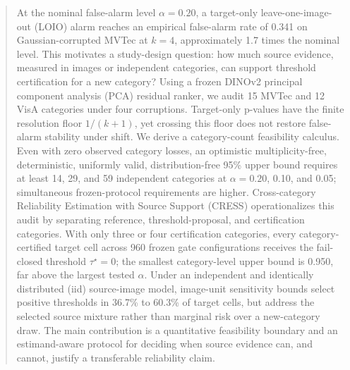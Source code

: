 \begin{abstract}
At the nominal false-alarm level $\alpha=0.20$, a target-only leave-one-image-out (LOIO) alarm reaches an empirical false-alarm rate of 0.341 on Gaussian-corrupted MVTec at $k=4$, approximately 1.7 times the nominal level. This motivates a study-design question: how much source evidence, measured in images or independent categories, can support threshold certification for a new category? Using a frozen DINOv2 principal component analysis (PCA) residual ranker, we audit 15 MVTec and 12 VisA categories under four corruptions. Target-only p-values have the finite resolution floor $1/(k{+}1)$, yet crossing this floor does not restore false-alarm stability under shift. We derive a category-count feasibility calculus. Even with zero observed category losses, an optimistic multiplicity-free, deterministic, uniformly valid, distribution-free 95\% upper bound requires at least 14, 29, and 59 independent categories at $\alpha=0.20$, 0.10, and 0.05; simultaneous frozen-protocol requirements are higher. Cross-category Reliability Estimation with Source Support (CRESS) operationalizes this audit by separating reference, threshold-proposal, and certification categories. With only three or four certification categories, every category-certified target cell across 960 frozen gate configurations receives the fail-closed threshold $\tau^\star=0$; the smallest category-level upper bound is 0.950, far above the largest tested $\alpha$. Under an independent and identically distributed (iid) source-image model, image-unit sensitivity bounds select positive thresholds in 36.7\% to 60.3\% of target cells, but address the selected source mixture rather than marginal risk over a new-category draw. The main contribution is a quantitative feasibility boundary and an estimand-aware protocol for deciding when source evidence can, and cannot, justify a transferable reliability claim.
\end{abstract}
